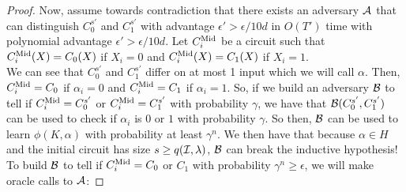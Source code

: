 \begin{lemma}
\begin{proof}
		Now, assume towards contradiction that there exists an adversary $\mathcal{A}$ that can distinguish $C_0^{s'}$ and $C_1^{s'}$ with advantage $\epsilon' > \epsilon / 10d$
		in $O(T')$ time with polynomial advantage $\epsilon' > \epsilon / 10d$.
		Let $C^{\text{Mid}}_i$ be a circuit such that $C^{\text{Mid}}_i(X) = C_0(X)$ if $X_i = 0$ and $C^{\text{Mid}}_i(X) = C_1(X)$ if $X_i = 1$.\\
		We can see that $C_0^{s'}$ and $C_1^{s'}$ differ on at most 1 input which we will call $\alpha$. %
		Then, $C^{\text{Mid}}_i = C_0$ if $\alpha_i = 0$ and $C^{\text{Mid}}_i = C_1$ if $\alpha_i = 1$.
		So, if we build an adversary $\mathcal{B}$ to tell if $C^{\text{Mid}}_i = C_0^{s'}$ or $C^{\text{Mid}}_i = C_1^{s'}$ with probability $\gamma$,
		we have that $\mathcal{B}(C_0^{s'}, C_1^{s'})$ can be used to check if $\alpha_i$ is $0$ or $1$ with probability $\gamma$.
		So then, $\mathcal{B}$ can be used to learn $\phi(K, \alpha)$ with probability at least $\gamma^n$.
		We then have that because $\alpha \in H$ and the initial circuit has size $s \geq q(\mathcal{I}, \lambda)$, $\mathcal{B}$ can break the inductive hypothesis!\\
		\linebreak
		To build $\mathcal{B}$ to tell if $C^{\text{Mid}}_i = C_0$ or $C_1$ with probability $\gamma^n \geq \epsilon$, we will make oracle calls to $\mathcal{A}$:

\end{proof}
\end{lemma}
